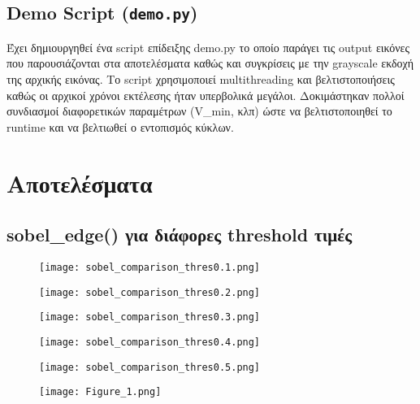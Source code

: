 \documentclass{article}
\begin{document}
\subsection{Demo Script (\texttt{demo.py})}
Έχει δημιουργηθεί ένα script επίδειξης demo.py το οποίο παράγει τις output εικόνες που παρουσιάζονται στα αποτελέσματα καθώς και συγκρίσεις με την grayscale εκδοχή της αρχικής εικόνας.
Το script χρησιμοποιεί multithreading και βελτιστοποιήσεις καθώς οι αρχικοί χρόνοι εκτέλεσης ήταν υπερβολικά μεγάλοι. Δοκιμάστηκαν πολλοί συνδιασμοί διαφορετικών παραμέτρων (V\_min, κλπ) ώστε να βελτιστοποιηθεί το runtime και να βελτιωθεί ο εντοπισμός κύκλων.

\section{Αποτελέσματα}
\subsection{sobel\_edge() για διάφορες threshold τιμές}
\begin{figure}[H]
  \centering
  \texttt{[image: sobel\_comparison\_thres0.1.png]}
  \label{fig:Sobel-0.1}
\end{figure}

\begin{figure}[H]
  \centering
  \texttt{[image: sobel\_comparison\_thres0.2.png]}
  \label{fig:Sobel-0.2}
\end{figure}

\begin{figure}[H]
  \centering
  \texttt{[image: sobel\_comparison\_thres0.3.png]}
  \label{fig:Sobel-0.3}
\end{figure}

\begin{figure}[H]
  \centering
  \texttt{[image: sobel\_comparison\_thres0.4.png]}
  \label{fig:Sobel-0.4}
\end{figure}

\begin{figure}[H]
  \centering
  \texttt{[image: sobel\_comparison\_thres0.5.png]}
  \label{fig:Sobel-0.5}
\end{figure}

\begin{figure}[H]
  \centering
  \texttt{[image: Figure\_1.png]}
  \label{fig:Sobel-fig}
\end{figure}
\end{document}
